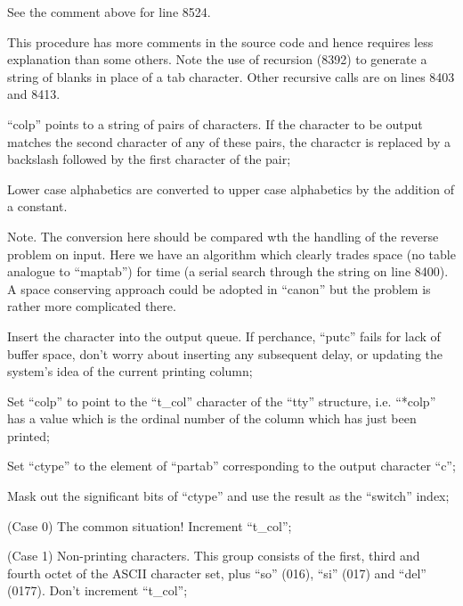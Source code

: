 
See the comment above for line 8524.


This procedure has more comments in the
source code and hence requires less
explanation than some others. Note the
use of recursion (8392) to generate a
string of blanks in place of a tab
character. Other recursive calls are
on lines 8403 and 8413.


\bd
\item[8400:] ``colp'' points to a string of
pairs of characters. If the character to be output matches the
second character of any of these
pairs, the charactcr is replaced
by a backslash followed by the first character of the pair;

\item[8407:] Lower case alphabetics are converted to upper case alphabetics
by the addition of a constant.
\ed

\noindent Note. The conversion here should be
compared wth the handling of the
reverse problem on input. Here we have
an algorithm which clearly trades space
(no table analogue to ``maptab'') for
time (a serial search through the
string on line 8400). A space conserving
approach could be adopted in
``canon'' but the problem is rather more
complicated there.

\bd
\item[8414:] Insert the character into the
output queue. If perchance,
``putc'' fails for lack of buffer
space, don't worry about inserting any subsequent delay, or
updating the system's idea of the
current printing column;

\item[8423:] Set ``colp'' to point to the
``t\_col'' character of the ``tty''
structure, i.e. ``*colp'' has a
value which is the ordinal number
of the column which has just been
printed;

\item[8424:] Set ``ctype'' to the element of
``partab'' corresponding to the
output character ``c'';


\item[8426:] Mask out the significant bits of
``ctype'' and use the result as the
``switch'' index;

\item[8428:] (Case 0) The common situation!
Increment ``t\_col'';

\item[8431:] (Case 1) Non-printing characters.
This group consists of the first,
third and fourth octet of the
ASCII character set, plus ``so''
(016), ``si'' (017) and ``del''
(0177). Don't increment ``t\_col'';

